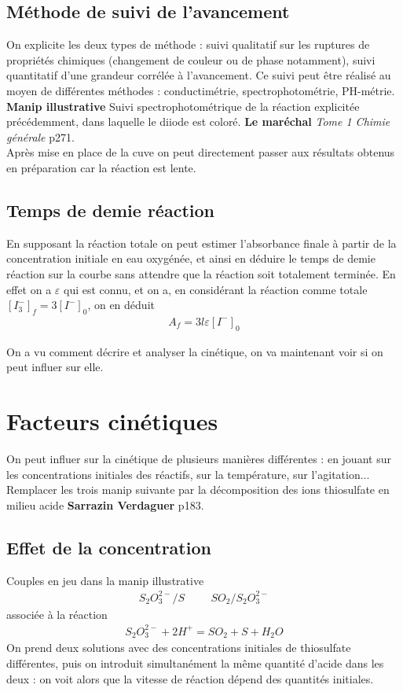 \documentclass[12pt,prb,aps,epsf]{article}
\begin{document}
\subsection{Méthode de suivi de l'avancement}
On explicite les deux types de méthode : suivi qualitatif sur les ruptures de propriétés chimiques (changement de couleur ou de phase notamment), suivi quantitatif d'une grandeur corrélée à l'avancement. Ce suivi peut être réalisé au moyen de différentes méthodes : conductimétrie, spectrophotométrie, PH-métrie.\\
\textbf{Manip illustrative} Suivi spectrophotométrique de la réaction explicitée précédemment, dans laquelle le diiode est coloré. \textbf{Le maréchal} \textit{Tome 1 Chimie générale} p271.\\ Après mise en place de la cuve on peut directement passer aux résultats obtenus en préparation car la réaction est lente.

\subsection{Temps de demie réaction}
En supposant la réaction totale on peut estimer l'absorbance finale à partir de la concentration initiale en eau oxygénée, et ainsi en déduire le temps de demie réaction sur la courbe sans attendre que la réaction soit totalement terminée. En effet on a $\varepsilon$ qui est connu, et on a, en considérant la réaction comme totale $[I_3^-]_f = 3[I^-]_0$, on en déduit 
\begin{eqnarray}
A_f = 3 l \varepsilon[I^-]_0
\end{eqnarray}

On a vu comment décrire et analyser la cinétique, on va maintenant voir si on peut influer sur elle.

\section{Facteurs cinétiques}
On peut influer sur la cinétique de plusieurs manières différentes : en jouant sur les concentrations initiales des réactifs, sur la température, sur l'agitation...\\

Remplacer les trois manip suivante par la décomposition des ions thiosulfate en milieu acide \textbf{Sarrazin Verdaguer} p183.

\subsection{Effet de la concentration}
Couples en jeu dans la manip illustrative 
\begin{eqnarray}
S_2O_3^{2-}/S\hspace{1cm} SO_2/S_2O_3^{2-}
\end{eqnarray}	
associée à la réaction 
\begin{eqnarray}
S_2O_3^{2-} + 2H^+ = SO_2 + S + H_2O
\end{eqnarray}
On prend deux solutions avec des concentrations initiales de thiosulfate différentes, puis on introduit simultanément la même quantité d'acide dans les deux : on voit alors que la vitesse de réaction dépend des quantités initiales.
\end{document}
